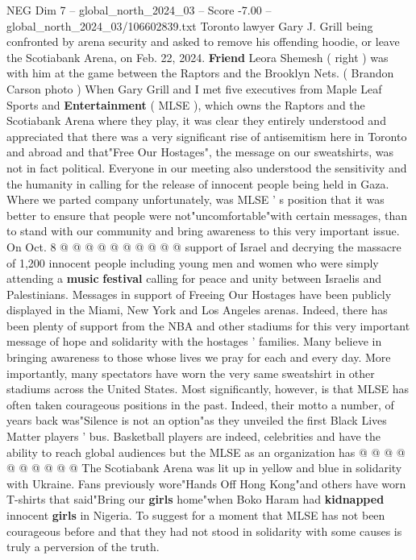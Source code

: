 \begin{textsample}{NEG Dim 7 – global\_north\_2024\_03 – Score -7.00 – global\_north\_2024\_03/106602839.txt}  \label{ex:f7_neg_235}
Toronto lawyer Gary J.
Grill being confronted by arena security and asked to remove his offending hoodie, or leave the Scotiabank Arena, on Feb. 22, 2024. \textbf{Friend} Leora Shemesh ( right ) was with him at the game between the Raptors and the Brooklyn Nets. ( Brandon Carson photo ) When Gary Grill and I met five executives from Maple Leaf Sports and \textbf{Entertainment} ( MLSE ), which owns the Raptors and the Scotiabank Arena where they play, it was clear they entirely understood and appreciated that there was a very significant rise of antisemitism here in Toronto and abroad and that"Free Our Hostages", the message on our sweatshirts, was not in fact political.
Everyone in our meeting also understood the sensitivity and the humanity in calling for the release of innocent people being held in Gaza.
Where we parted company unfortunately, was MLSE ' s position that it was better to ensure that people were not"uncomfortable"with certain messages, than to stand with our community and bring awareness to this very important issue.
On Oct. 8 @ @ @ @ @ @ @ @ @ @ support of Israel and decrying the massacre of 1,200 innocent people including young men and women who were simply attending a \textbf{music} \textbf{festival} calling for peace and unity between Israelis and Palestinians.
Messages in support of Freeing Our Hostages have been publicly displayed in the Miami, New York and Los Angeles arenas.
Indeed, there has been plenty of support from the NBA and other stadiums for this very important message of hope and solidarity with the hostages ' families.
Many believe in bringing awareness to those whose lives we pray for each and every day.
More importantly, many spectators have worn the very same sweatshirt in other stadiums across the United States.
Most significantly, however, is that MLSE has often taken courageous positions in the past.
Indeed, their motto a number, of years back was"Silence is not an option"as they unveiled the first Black Lives Matter players ' bus.
Basketball players are indeed, celebrities and have the ability to reach global audiences but the MLSE as an organization has @ @ @ @ @ @ @ @ @ @ The Scotiabank Arena was lit up in yellow and blue in solidarity with Ukraine.
Fans previously wore"Hands Off Hong Kong"and others have worn T-shirts that said"Bring our \textbf{girls} home"when Boko Haram had \textbf{kidnapped} innocent \textbf{girls} in Nigeria.
To suggest for a moment that MLSE has not been courageous before and that they had not stood in solidarity with some causes is truly a perversion of the truth.

\end{textsample}

